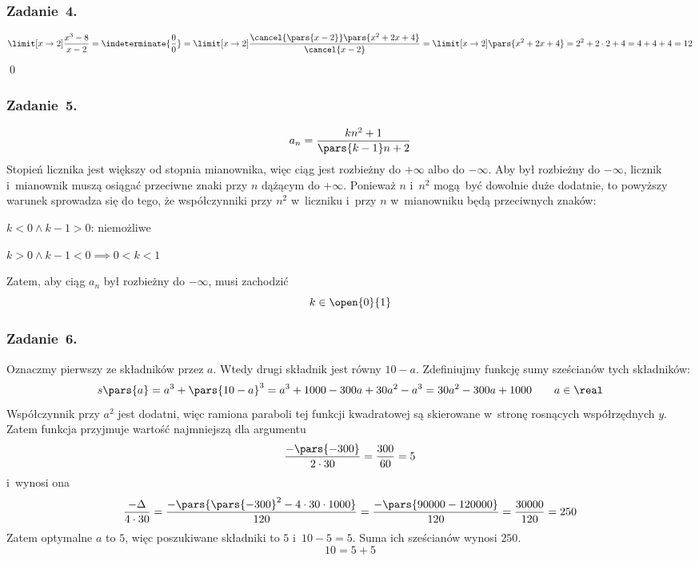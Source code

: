 \subsubsection*{Zadanie~4.}
\begin{equation*}
    \limit[x \to 2] \frac{x^3 - 8}{x - 2}
        = \indeterminate{\frac{0}{0}}
        = \limit[x \to 2] \frac{\cancel{\pars{x - 2}}\pars{x^2 + 2x + 4}}{\cancel{x - 2}}
        = \limit[x \to 2] \pars{x^2 + 2x + 4}
        = 2^2 + 2 \cdot 2 + 4
        = 4 + 4 + 4
        = 12
\end{equation*}
\qed
\subsubsection*{Zadanie~5.}
\begin{equation*}
    a_n = \frac{kn^2 + 1}{\pars{k - 1}n + 2}
\end{equation*}
Stopień licznika jest większy od stopnia mianownika, więc ciąg jest rozbieżny do \(+\infty\) albo do \(-\infty\). Aby był rozbieżny do \(-\infty\), licznik i~mianownik muszą osiągać przeciwne znaki przy \(n\) dążącym do \(+\infty\). Ponieważ \(n\) i~\(n^2\) mogą być dowolnie duże dodatnie, to powyższy warunek sprowadza się do tego, że współczynniki przy \(n^2\) w~liczniku i~przy \(n\) w~mianowniku będą przeciwnych znaków:
\begin{proofcases}
    \item \(k < 0 \land k - 1 > 0\): niemożliwe
    \item \(k > 0 \land k - 1 < 0 \implies 0 < k < 1\)
\end{proofcases}
Zatem, aby ciąg \(a_n\) był rozbieżny do \(-\infty\), musi zachodzić
\begin{equation*}
    k \in \open{0}{1}
\end{equation*}
\subsubsection*{Zadanie~6.}
Oznaczmy pierwszy ze składników przez \(a\). Wtedy drugi składnik jest równy \(10 - a\). Zdefiniujmy funkcję sumy sześcianów tych składników:
\begin{equation*}
    s\pars{a}
        = a^3 + \pars{10 - a}^3
        = a^3 + 1000 - 300a + 30a^2 - a^3
        = 30a^2 - 300a + 1000 \qquad a \in \real
\end{equation*}
Współczynnik przy \(a^2\) jest dodatni, więc ramiona paraboli tej funkcji kwadratowej są skierowane w~stronę rosnących współrzędnych \(y\). Zatem funkcja przyjmuje wartość najmniejszą dla argumentu
\begin{equation*}
    \frac{-\pars{-300}}{2 \cdot 30}
        = \frac{300}{60}
        = 5
\end{equation*}
i~wynosi ona
\begin{equation*}
    \frac{-\Delta}{4 \cdot 30}
        = \frac{-\pars{\pars{-300}^2 - 4 \cdot 30 \cdot 1000}}{120}
        = \frac{-\pars{90000 - 120000}}{120}
        = \frac{30000}{120}
        = 250
\end{equation*}
Zatem optymalne \(a\) to \(5\), więc poszukiwane składniki to \(5\) i~\(10 - 5 = 5\). Suma ich sześcianów wynosi \(250\).
\begin{equation*}
    10 = 5 + 5
\end{equation*}
